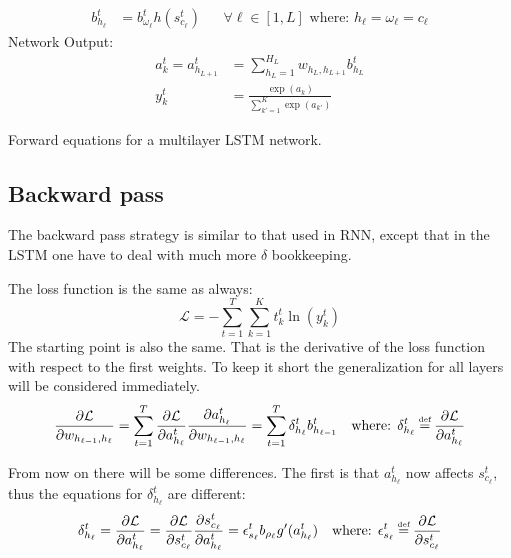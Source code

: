 \begin{equationbox}[H]
\begin{equation*}
\begin{aligned}
b_{h_\ell}^t &= b_{\omega_\ell}^t h(s_{c_\ell}^t) && \forall \ell \in [1, L] \text{ where: } h_\ell = \omega_\ell = c_\ell
\end{aligned}
\end{equation*}
Network Output:
\begin{equation*}
\begin{aligned}
a_k^t = a_{h_{L+1}}^t &= \sum_{h_L=1}^{H_L} w_{h_L, h_{L+1}} b_{h_L}^t \\
y_k^t &= \frac{\exp(a_k)}{\sum_{k'=1}^K \exp(a_{k'})}
\end{aligned}
\end{equation*}
\caption{Forward equations for a multilayer LSTM network.}
\end{equationbox}

\newpage
\subsection{Backward pass}
\label{sec:theory:lstm:backward-pass}

The backward pass strategy is similar to that used in RNN, except that in the LSTM one have to deal with much more $\delta$ bookkeeping.

The loss function is the same as always:
\begin{equation}
\mathcal{L} = - \sum_{t=1}^T \sum_{k=1}^K t_k^t \ln(y_k^t)
\end{equation}
The starting point is also the same. That is the derivative of the loss function with respect to the first weights. To keep it short the generalization for all layers will be considered immediately.
\begin{equation}
\frac{\partial \mathcal{L}}{\partial w_{h_{\ell-1}, h_\ell}}
= \sum_{t=1}^T \frac{\partial \mathcal{L}}{\partial a_{h_\ell}^t} \frac{\partial a_{h_\ell}^t}{\partial w_{h_{\ell-1}, h_\ell}}
= \sum_{t=1}^T \delta_{h_\ell}^t b_{h_{\ell-1}}^t
\quad \text{where: } \delta_{h_\ell}^t \defeq \frac{\partial \mathcal{L}}{\partial a_{h_\ell}^t}
\end{equation}

From now on there will be some differences. The first is that $a_{h_\ell}^t$ now affects $s_{c_\ell}^t$, thus the equations for $\delta_{h_\ell}^t$ are different:
\begin{equation}
\delta_{h_\ell}^t
= \frac{\partial \mathcal{L}}{\partial a_{h_\ell}^t}
= \frac{\partial \mathcal{L}}{\partial s_{c_\ell}^t} \frac{\partial s_{c_\ell}^t}{\partial a_{h_\ell}^t}
= \epsilon_{s_\ell}^t b_{\rho_\ell}{g'(a_{h_\ell}^t)}
\quad \text{where: } \epsilon_{s_\ell}^t \defeq \frac{\partial \mathcal{L}}{\partial s_{c_\ell}^t}
\end{equation}

